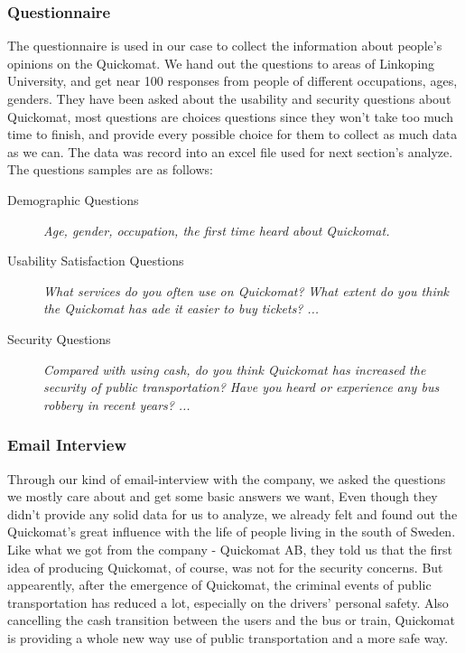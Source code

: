 \documentclass[twocolumn]{article}
\begin{document}
\subsubsection{Questionnaire}
The questionnaire is used in our case to collect the information about people’s opinions on the Quickomat. We hand out the questions to areas of Linkoping University, and get near 100 responses from people of different occupations, ages, genders. They have been asked about the usability and security questions about Quickomat, most questions are choices questions since they won’t take too much time to finish, and provide every possible choice for them to collect as much data as we can. The data was record into an excel file used for next section’s analyze. The questions samples are as follows:
\begin{description}
\item[Demographic Questions]
    \emph{Age, gender, occupation, the first time heard about Quickomat.}
\item[Usability Satisfaction Questions]
    \emph{What services do you often use on Quickomat?}
    \emph{What extent do you think the Quickomat has ade it easier to buy tickets?}
    \emph{...}
\item[Security Questions]
    \emph{Compared with using cash, do you think Quickomat has increased the security of public transportation?}
    \emph{Have you heard or experience any bus robbery in recent years?}
    \emph{...}
\end{description}

\subsubsection{Email Interview}
Through our kind of email-interview with the company, we asked the questions we mostly care about and get some basic answers we want, Even though they didn't provide any solid data for us to analyze, we already felt and found out the Quickomat's great influence with the life of people living in the south of Sweden. %
Like what we got from the company - Quickomat AB, they told us that the first idea of producing Quickomat, of course, was not for the security concerns. But appearently, after the emergence of Quickomat, the criminal events of public transportation has reduced a lot, especially on the drivers' personal safety. Also cancelling the cash transition between the users and the bus or train, Quickomat is providing a whole new way use of public transportation and a more safe way.
\end{document}

